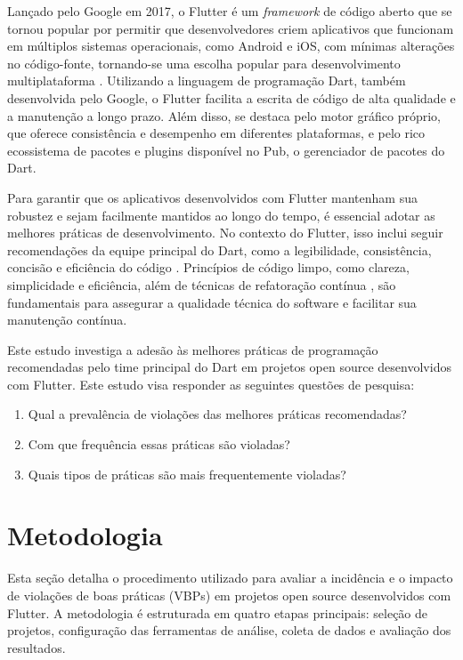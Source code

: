 \documentclass[12pt]{article}
\begin{document}
Lançado pelo Google em 2017, o Flutter é um \textit{framework} de código aberto que se tornou popular por permitir que desenvolvedores criem aplicativos que funcionam em múltiplos sistemas operacionais, como Android e iOS, com mínimas alterações no código-fonte, tornando-se uma escolha popular para desenvolvimento multiplataforma \cite{flutter}. Utilizando a linguagem de programação Dart, também desenvolvida pelo Google, o Flutter facilita a escrita de código de alta qualidade e a manutenção a longo prazo. Além disso, se destaca pelo motor gráfico próprio, que oferece consistência e desempenho em diferentes plataformas, e pelo rico ecossistema de pacotes e plugins disponível no Pub, o gerenciador de pacotes do Dart.

Para garantir que os aplicativos desenvolvidos com Flutter mantenham sua robustez e sejam facilmente mantidos ao longo do tempo, é essencial adotar as melhores práticas de desenvolvimento. No contexto do Flutter, isso inclui seguir recomendações da equipe principal do Dart, como a legibilidade, consistência, concisão e eficiência do código \cite{dartBestPractices}. Princípios de código limpo, como clareza, simplicidade e eficiência, além de técnicas de refatoração contínua \cite{fowler1999refactoring}, são fundamentais para assegurar a qualidade técnica do software e facilitar sua manutenção contínua.

Este estudo investiga a adesão às melhores práticas de programação recomendadas pelo time principal do Dart em projetos open source desenvolvidos com Flutter. Este estudo visa responder as seguintes questões de pesquisa:
\begin{enumerate}
\item Qual a prevalência de violações das melhores práticas recomendadas?
\item Com que frequência essas práticas são violadas?
\item Quais tipos de práticas são mais frequentemente violadas?
\end{enumerate}

\section{Metodologia}

Esta seção detalha o procedimento utilizado para avaliar a incidência e o impacto de violações de boas práticas (VBPs) em projetos open source desenvolvidos com Flutter. A metodologia é estruturada em quatro etapas principais: seleção de projetos, configuração das ferramentas de análise, coleta de dados e avaliação dos resultados.
\end{document}
